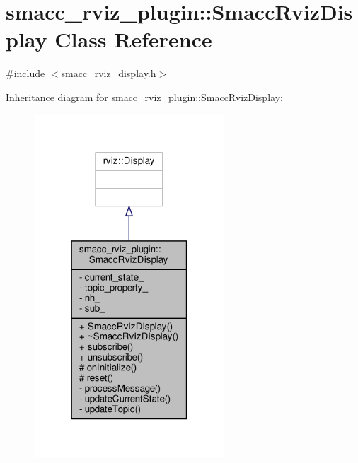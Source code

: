 \hypertarget{classsmacc__rviz__plugin_1_1SmaccRvizDisplay}{}\section{smacc\+\_\+rviz\+\_\+plugin\+:\+:Smacc\+Rviz\+Display Class Reference}
\label{classsmacc__rviz__plugin_1_1SmaccRvizDisplay}


{\ttfamily \#include $<$smacc\+\_\+rviz\+\_\+display.\+h$>$}



Inheritance diagram for smacc\+\_\+rviz\+\_\+plugin\+:\+:Smacc\+Rviz\+Display\+:\nopagebreak
\begin{figure}[H]
\begin{center}
\leavevmode
\includegraphics[width=202pt]{classsmacc__rviz__plugin_1_1SmaccRvizDisplay__inherit__graph}
\end{center}
\end{figure}


